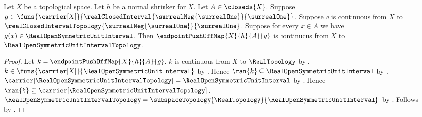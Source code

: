 \begin{theorem}\label{endpoint_push_off_map_continuous_open_interval}
    Let $X$ be a topological space.
    Let $h$ be a normal shrinker for $X$.
    Let $A\in\closeds{X}$.
    Suppose
        $g\in\funs{\carrier[X]}
            {\realClosedInterval
                {\surrealNeg{\surrealOne}}{\surrealOne}}$.
    Suppose $g$ is continuous from $X$ to
        $\realClosedIntervalTopology
            {\surrealNeg{\surrealOne}}{\surrealOne}$.
    Suppose for every $x\in A$ we have
        $g(x)\in\RealOpenSymmetricUnitInterval$.
    Then $\endpointPushOffMap{X}{h}{A}{g}$ is continuous from $X$ to
        $\RealOpenSymmetricUnitIntervalTopology$.
\end{theorem}
\begin{proof}
    Let $k=\endpointPushOffMap{X}{h}{A}{g}$.
    $k$ is continuous from $X$ to $\RealTopology$
        by .
    $k\in\funs{\carrier[X]}{\RealOpenSymmetricUnitInterval}$
        by .
    Hence $\ran{k}\subseteq\RealOpenSymmetricUnitInterval$
        by .
    $\carrier[\RealOpenSymmetricUnitIntervalTopology]
        =\RealOpenSymmetricUnitInterval$
        by
        .
    Hence
        $\ran{k}\subseteq
            \carrier[\RealOpenSymmetricUnitIntervalTopology]$.
    $\RealOpenSymmetricUnitIntervalTopology
        =\subspaceTopology{\RealTopology}
            {\RealOpenSymmetricUnitInterval}$
        by
        .
    Follows by .
\end{proof}

